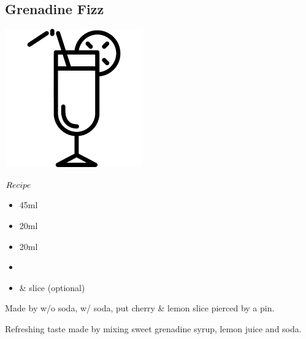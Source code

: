 \subsection{Grenadine Fizz}
\vspace{-7mm}
\hspace{45mm}
\includegraphics[scale=.07]{cocktail_glass_tall.png}
\vspace{2.5mm}
\begin{itembox}[l]{\boldmath $Recipe$}
\begin{itemize}
\setlength{\parskip}{0cm}
\setlength{\itemsep}{0cm}
\item \gin 45ml
\item \lj 20ml
\item \gs 20ml
\item \soda
\item \cherry \& \lemon slice (optional)
\end{itemize}
\vspace{-4mm}
Made by \shake w/o soda, \build w/ soda, put cherry \& lemon slice pierced by a pin.
\end{itembox}
Refreshing taste made by mixing sweet grenadine syrup, lemon juice and soda.
